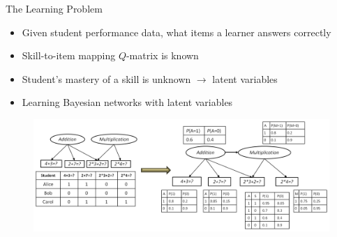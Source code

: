 \documentclass[hyperref={pdfpagelabels=false}]{beamer}
\begin{document}
\begin{frame}{The Learning Problem}
		\begin{itemize}\small
			\item Given student performance data, what items a learner answers correctly
			\item Skill-to-item mapping $Q$-matrix is known
			\item Student's mastery of a skill is unknown $\rightarrow$ latent variables
			\item Learning Bayesian networks with latent variables 
		\end{itemize}

	\begin{figure}[h]
		\begin{center}
			\includegraphics[scale = .4]{figures/prereqdiscovery.png}
		\end{center}
	\end{figure}
\end{frame}
\end{document}
